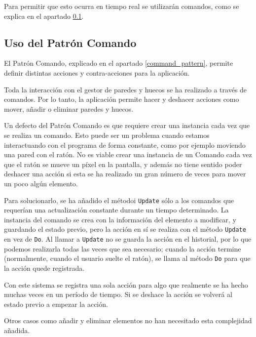 Para permitir que esto ocurra en tiempo real se utilizarán comandos, como se explica en el apartado \ref{use_of_command}.

\subsection{Uso del Patrón Comando}
\label{use_of_command}
El Patrón Comando, explicado en el apartado \ref{command_pattern}, permite definir distintas acciones y contra-acciones para la aplicación.

Toda la interacción con el gestor de paredes y huecos se ha realizado a través de comandos. Por lo tanto, la aplicación permite hacer y deshacer acciones como mover, añadir o eliminar paredes y huecos.

Un defecto del Patrón Comando es que requiere crear una instancia cada vez que se realiza un comando. Esto puede ser un problema cuando estamos interactuando con el programa de forma constante, como por ejemplo moviendo una pared con el ratón. No es viable crear una instancia de un Comando cada vez que el ratón se mueve un píxel en la pantalla, y además no tiene sentido poder deshacer una acción si esta se ha realizado un gran número de veces para mover un poco algún elemento.

Para solucionarlo, se ha añadido el métodoi \texttt{Update} sólo a los comandos que requerían una actualización constante durante un tiempo determinado. La instancia del comando se crea con la información del elemento a modificar, y guardando el estado previo, pero la acción en sí se realiza con el método \texttt{Update} en vez de \texttt{Do}. Al llamar a \texttt{Update} no se guarda la acción en el historial, por lo que podemos realizarla todas las veces que sea necesario; cuando la acción termine (normalmente, cuando el usuario suelte el ratón), se llama al método \texttt{Do} para que la acción quede registrada.

Con este sistema se registra una sola acción para algo que realmente se ha hecho muchas veces en un período de tiempo. Si se deshace la acción se volverá al estado previo a empezar la acción.

Otros casos como añadir y eliminar elementos no han necesitado esta complejidad añadida.